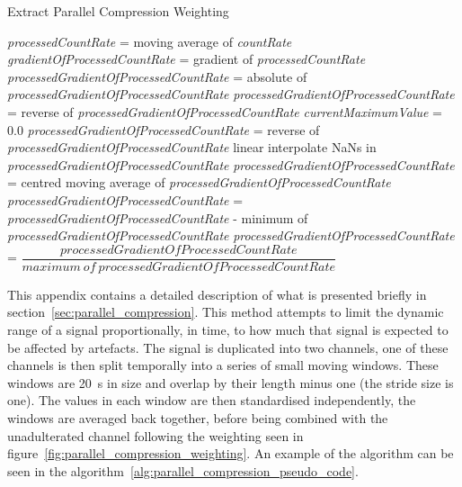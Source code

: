         \begin{algorithm} \label{alg:extract_parallel_compression_weighting_pseudo_code}
            \caption{Extract Parallel Compression Weighting}
            \;
            \textit{processedCountRate} = moving average of \textit{countRate}\;
            \;
            \textit{gradientOfProcessedCountRate} = gradient of \textit{processedCountRate}\;
            \;
            \textit{processedGradientOfProcessedCountRate} = absolute of \textit{processedGradientOfProcessedCountRate}\;
            \;
            \textit{processedGradientOfProcessedCountRate} = reverse of \textit{processedGradientOfProcessedCountRate}\;
            \textit{currentMaximumValue} = 0.0\;
            \;
            \;
            \textit{processedGradientOfProcessedCountRate} = reverse of \textit{processedGradientOfProcessedCountRate}\;
            linear interpolate \glspl{NaN} in \textit{processedGradientOfProcessedCountRate}\;
            \;
            \textit{processedGradientOfProcessedCountRate} = centred moving average of \textit{processedGradientOfProcessedCountRate}\;
            \;
            \textit{processedGradientOfProcessedCountRate} = \textit{processedGradientOfProcessedCountRate} - minimum of \textit{processedGradientOfProcessedCountRate}\;
            \textit{processedGradientOfProcessedCountRate} = $\dfrac{\textit{processedGradientOfProcessedCountRate}}{maximum\ of\ \textit{processedGradientOfProcessedCountRate}}$\;
        \end{algorithm}

        This appendix contains a detailed description of what is presented briefly in section~\ref{sec:parallel_compression}. This method attempts to limit the dynamic range of a signal proportionally, in time, to how much that signal is expected to be affected by artefacts. The signal is duplicated into two channels, one of these channels is then split temporally into a series of small moving windows. These windows are \SI{20}{\second} in size and overlap by their length minus one (the stride size is one). The values in each window are then standardised independently, the windows are averaged back together, before being combined with the unadulterated channel following the weighting seen in figure~\ref{fig:parallel_compression_weighting}. An example of the algorithm can be seen in the algorithm~\ref{alg:parallel_compression_pseudo_code}.
        
